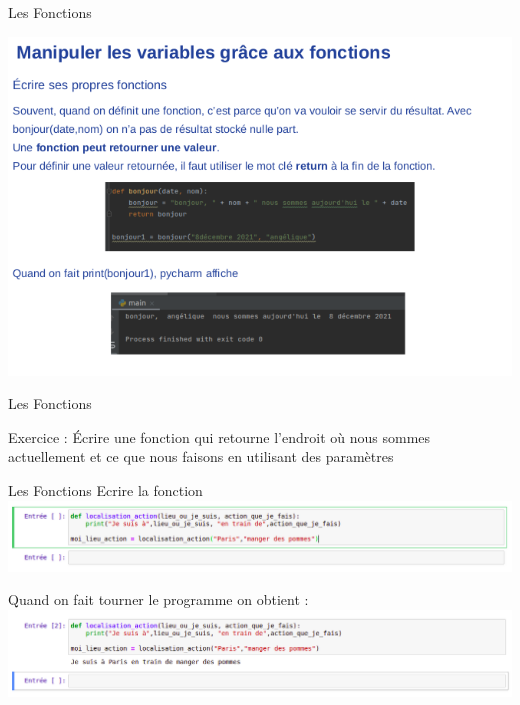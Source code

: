\begin{frame}{Les Fonctions}

\includegraphics[scale=0.5]{images/fonction-4.png}
    
\end{frame}

\begin{frame}{Les Fonctions}

Exercice :
Écrire une fonction qui retourne l’endroit où nous sommes actuellement et ce que nous faisons en utilisant des paramètres
    
\end{frame}


\begin{frame}{Les Fonctions}
Ecrire la fonction 
\includegraphics[scale=0.3]{images/fonction_1.png}
\pause

\vspace{1cm}
Quand on fait tourner le programme on obtient : 
\includegraphics[scale=0.3]{images/fonction2.png}

\end{frame}
